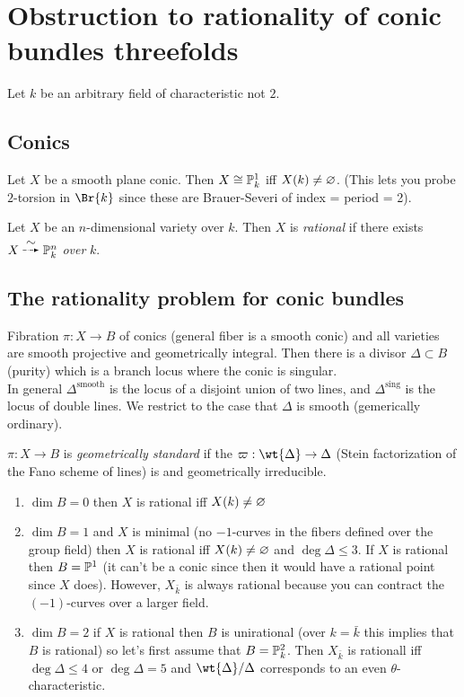 \documentclass[12pt]{article}
\begin{document}
\section{Obstruction to rationality of conic bundles threefolds}

Let $k$ be an arbitrary field of characteristic not $2$.

\subsection{Conics}

Let $X$ be a smooth plane conic. Then $X \cong \P^1_k$ iff $X(k) \neq \empty$. (This lets you probe $2$-torsion in $\Br{k}$ since these are Brauer-Severi of index = period = 2). 

\begin{defn}
Let $X$ be an $n$-dimensional variety over $k$. Then $X$ is \textit{rational} if there exists $X \birat \P^n_k$ \textit{over} $k$.
\end{defn}

\subsection{The rationality problem for conic bundles}

Fibration $\pi : X \to B$ of conics (general fiber is a smooth conic) and all varieties are smooth projective and geometrically integral. Then there is a divisor $\Delta \subset B$ (purity) which is a branch locus where the conic is singular. 
\bigskip\\
In general $\Delta^{\text{smooth}}$ is the locus of a disjoint union of two lines, and $\Delta^{\text{sing}}$ is the locus of double lines. We restrict to the case that $\Delta$ is smooth (gemerically ordinary).

\begin{defn}
$\pi : X \to B$ is \textit{geometrically standard} if the $\varpi : \wt{\Delta} \to \Delta$ (Stein factorization of the Fano scheme of lines) is \etale and geometrically irreducible. 
\end{defn}

\begin{enumerate}
\item $\dim B = 0$ then $X$ is rational iff $X(k) \neq \empty$

\item $\dim{B} = 1$ and $X$ is minimal (no $-1$-curves in the fibers defined over the group field) then $X$ is rational iff $X(k) \neq \empty$ and $\deg{\Delta} \le 3$. If $X$ is rational then $B = \P^1$ (it can't be a conic since then it would have a rational point since $X$ does). However, $X_{\bar{k}}$ is always rational because you can contract the $(-1)$-curves over a larger field.

\item $\dim{B} = 2$ if $X$ is rational then $B$ is unirational (over $k = \bar{k}$ this implies that $B$ is rational) so let's first assume that $B = \P^2_k$. Then $X_{\bar{k}}$ is rationall iff $\deg{\Delta} \le 4$ or $\deg{\Delta} = 5$ and $\wt{\Delta} / \Delta$ corresponds to an even $\theta$-characteristic. 
\end{enumerate}
\end{document}
